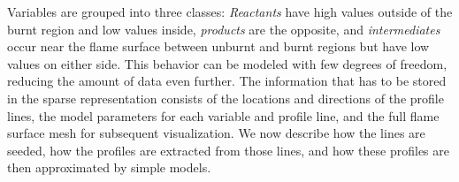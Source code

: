 %
Variables are grouped into three classes: \emph{Reactants} have high
values outside of the burnt region and low values inside,
\emph{products} are the opposite, and \emph{intermediates} occur near the flame
surface between unburnt and burnt regions but have low values on either side.
%
This behavior can be modeled with few degrees of freedom, reducing the amount of
data even further.
%
The information that has to be stored in the sparse representation consists of
the locations and directions of the profile lines, the model parameters for each
variable and profile line, and the full flame surface mesh for subsequent
visualization.
%
%
We now describe how the lines are seeded, how the profiles are extracted from
those lines, and how these profiles are then approximated by simple models.
% 
